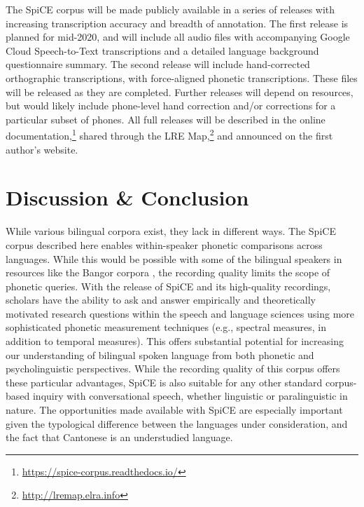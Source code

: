 The SpiCE corpus will be made publicly available in a series of releases with increasing transcription accuracy and breadth of annotation. The first release is planned for mid-2020, and will include all audio files with accompanying Google Cloud Speech-to-Text transcriptions and a detailed language background questionnaire summary. The second release will include hand-corrected orthographic transcriptions, with force-aligned phonetic transcriptions. These files will be released as they are completed. Further releases will depend on resources, but would likely include phone-level hand correction and/or corrections for a particular subset of phones. All full releases will be described in the online documentation,\footnote{\url{https://spice-corpus.readthedocs.io/}} shared through the LRE Map,\footnote{\url{http://lremap.elra.info}} and announced on the first author's website.

\section{Discussion \& Conclusion}\label{ch2:subsec:discussion}

While various bilingual corpora exist, they lack in different ways. The SpiCE corpus described here enables within-speaker phonetic comparisons across languages. While this would be possible with some of the bilingual speakers in resources like the Bangor corpora \citep{deuchar_2014_corpora}, the recording quality limits the scope of phonetic queries. With the release of SpiCE and its high-quality recordings, scholars have the ability to ask and answer empirically and theoretically motivated research questions within the speech and language sciences using more sophisticated phonetic measurement techniques (e.g., spectral measures, in addition to temporal measures). This offers substantial potential for increasing our understanding of bilingual spoken language from both phonetic and psycholinguistic perspectives. While the recording quality of this corpus offers these particular advantages, SpiCE is also suitable for any other standard corpus-based inquiry with conversational speech, whether linguistic or paralinguistic in nature. The opportunities made available with SpiCE are especially important given the typological difference between the languages under consideration, and the fact that Cantonese is an understudied language. 

\endinput
